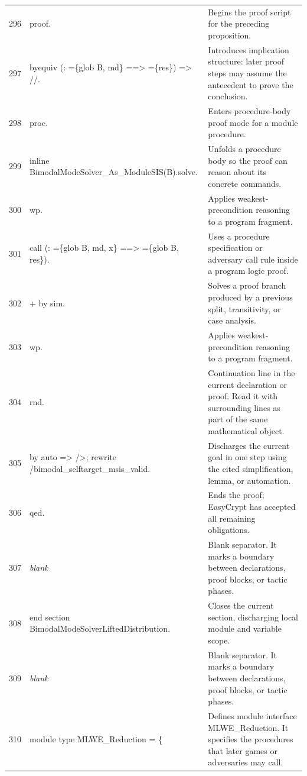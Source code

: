 \documentclass[10pt]{article}
\begin{document}
\begin{longtable}{r L{0.53\textwidth} L{0.37\textwidth}}
296 & {\ttfamily\scriptsize proof.} & Begins the proof script for the preceding proposition. \\
297 & {\ttfamily\scriptsize byequiv (: =\{glob B, md\} ==> =\{res\}) => //.} & Introduces implication structure: later proof steps may assume the antecedent to prove the conclusion. \\
298 & {\ttfamily\scriptsize proc.} & Enters procedure-body proof mode for a module procedure. \\
299 & {\ttfamily\scriptsize inline BimodalModeSolver\_As\_ModuleSIS(B).solve.} & Unfolds a procedure body so the proof can reason about its concrete commands. \\
300 & {\ttfamily\scriptsize wp.} & Applies weakest-precondition reasoning to a program fragment. \\
301 & {\ttfamily\scriptsize call (: =\{glob B, md, x\} ==> =\{glob B, res\}).} & Uses a procedure specification or adversary call rule inside a program logic proof. \\
302 & {\ttfamily\scriptsize + by sim.} & Solves a proof branch produced by a previous split, transitivity, or case analysis. \\
303 & {\ttfamily\scriptsize wp.} & Applies weakest-precondition reasoning to a program fragment. \\
304 & {\ttfamily\scriptsize rnd.} & Continuation line in the current declaration or proof.  Read it with surrounding lines as part of the same mathematical object. \\
305 & {\ttfamily\scriptsize by auto => />; rewrite /bimodal\_selftarget\_msis\_valid.} & Discharges the current goal in one step using the cited simplification, lemma, or automation. \\
306 & {\ttfamily\scriptsize qed.} & Ends the proof; EasyCrypt has accepted all remaining obligations. \\
307 & {\ttfamily\scriptsize \emph{blank}} & Blank separator.  It marks a boundary between declarations, proof blocks, or tactic phases. \\
308 & {\ttfamily\scriptsize end section BimodalModeSolverLiftedDistribution.} & Closes the current section, discharging local module and variable scope. \\
309 & {\ttfamily\scriptsize \emph{blank}} & Blank separator.  It marks a boundary between declarations, proof blocks, or tactic phases. \\
310 & {\ttfamily\scriptsize module type MLWE\_Reduction = \{} & Defines module interface MLWE\_Reduction.  It specifies the procedures that later games or adversaries may call. \\

\end{longtable}
\end{document}
